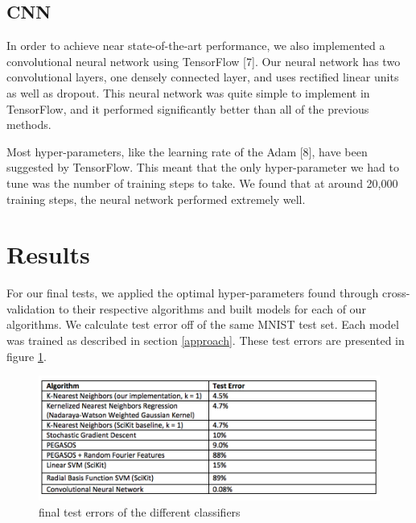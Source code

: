 \documentclass{article} %
\begin{document}
\subsection{CNN}
In order to achieve near state-of-the-art performance, we also implemented a
convolutional neural network using TensorFlow [7]. Our neural network has two
convolutional layers, one densely connected layer, and uses rectified linear
units as well as dropout. This neural network was quite simple to implement in
TensorFlow, and it performed significantly better than all of the previous methods.

Most hyper-parameters, like the learning rate of the Adam [8], have been
suggested by TensorFlow. This meant that the only hyper-parameter we had to tune
was the number of training steps to take. We found that at around 20,000 training
steps, the neural network performed extremely well.

\section{Results} \label{results}

For our final tests, we applied the optimal hyper-parameters found through cross-validation
to their respective algorithms and built models for
each of our algorithms. We calculate test error off of the same MNIST test set.
Each model was trained as described in section \ref{approach}. These test errors
are presented in figure \ref{fig:test-results}.

\begin{figure}[h]
\centering
\includegraphics[width=\textwidth]{test-results.png}
\caption{final test errors of the different classifiers}
\label{fig:test-results}
\end{figure}
\end{document}
